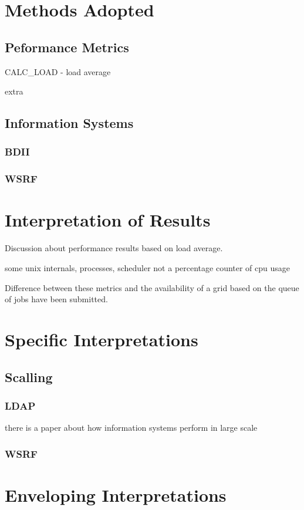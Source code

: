 \section{Methods Adopted}

\subsection{Peformance Metrics}

CALC\_LOAD - load average

extra
\newpage

\subsection{Information Systems}

\subsubsection{BDII}

\subsubsection{WSRF}

\newpage

\section{Interpretation of Results}


Discussion about performance results based on
load average.

some unix internals, processes, scheduler
not a percentage counter of cpu usage

\newpage

Difference between these metrics and the availability of 
a grid based on the queue of jobs have been submitted.

\newpage

\section{Specific Interpretations}

\subsection{Scalling}
\subsubsection{LDAP}

there is a paper about how information systems perform in large scale

\newpage

\subsubsection{WSRF}
\newpage
\section{Enveloping Interpretations}
